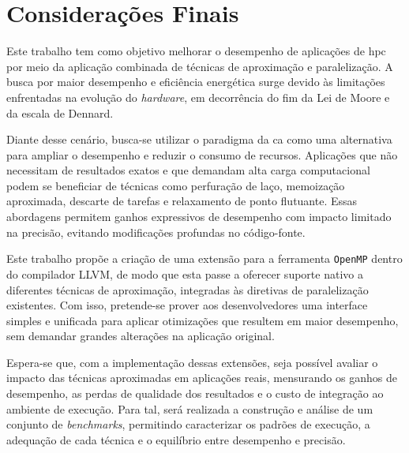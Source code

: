 \chapter{Considerações Finais}\label{cap:conclusao}

Este trabalho tem como objetivo melhorar o desempenho de aplicações de \gls{hpc} por meio da aplicação combinada de técnicas de aproximação e paralelização. A busca por maior desempenho e eficiência energética surge devido às limitações enfrentadas na evolução do \textit{hardware}, em decorrência do fim da Lei de Moore e da escala de Dennard.

Diante desse cenário, busca-se utilizar o paradigma da \gls{ca} como uma alternativa para ampliar o desempenho e reduzir o consumo de recursos. Aplicações que não necessitam de resultados exatos e que demandam alta carga computacional podem se beneficiar de técnicas como perfuração de laço, memoização aproximada, descarte de tarefas e relaxamento de ponto flutuante. Essas abordagens permitem ganhos expressivos de desempenho com impacto limitado na precisão, evitando modificações profundas no código-fonte.

Este trabalho propõe a criação de uma extensão para a ferramenta \texttt{OpenMP} dentro do compilador LLVM, de modo que esta passe a oferecer suporte nativo a diferentes técnicas de aproximação, integradas às diretivas de paralelização existentes. Com isso, pretende-se prover aos desenvolvedores uma interface simples e unificada para aplicar otimizações que resultem em maior desempenho, sem demandar grandes alterações na aplicação original.

Espera-se que, com a implementação dessas extensões, seja possível avaliar o impacto das técnicas aproximadas em aplicações reais, mensurando os ganhos de desempenho, as perdas de qualidade dos resultados e o custo de integração ao ambiente de execução. Para tal, será realizada a construção e análise de um conjunto de \textit{benchmarks}, permitindo caracterizar os padrões de execução, a adequação de cada técnica e o equilíbrio entre desempenho e precisão.